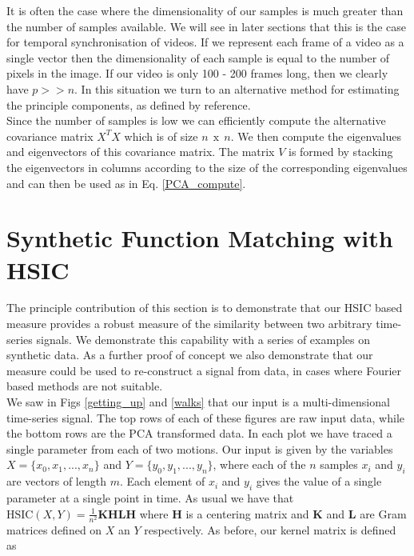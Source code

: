 It is often the case where the dimensionality of our samples is much greater than the number of samples available. We will see in later sections that this is the case for temporal synchronisation of videos. If we represent each frame of a video as a single vector then the dimensionality of each sample is equal to the number of pixels in the image. If our video is only 100 - 200 frames long, then we clearly have $p >> n$. In this situation we turn to an alternative method for estimating the principle components, as defined by reference. \\

Since the number of samples is low we can efficiently compute the alternative covariance matrix $X^{T} X$ which is of size $n\:\:\text{x}\:\:n$. We then compute the eigenvalues and eigenvectors of this covariance matrix. The matrix $V$ is formed by stacking the eigenvectors in columns according to the size of the corresponding eigenvalues and can then be used as in Eq. \ref{PCA_compute}.\\


\section{Synthetic Function Matching with HSIC}

The principle contribution of this section is to demonstrate that our HSIC based measure provides a robust measure of the similarity between two arbitrary time-series signals. We demonstrate this capability with a series of examples on synthetic data. As a further proof of concept we also demonstrate that our measure could be used to re-construct a signal from data, in cases where Fourier based methods are not suitable. \\

We saw in Figs \ref{getting_up} and \ref{walks} that our input is a multi-dimensional time-series signal. The top rows of each of these figures are raw input data, while the bottom rows are the PCA transformed data. In each plot we have traced a single parameter from each of two motions. Our input is given by the variables $X = \{x_0, x_1, ..., x_n\}$ and $Y = \{y_0, y_1, ..., y_n\}$, where each of the $n$ samples $x_i$ and $y_i$ are vectors of length $m$. Each element of $x_i$ and $y_i$ gives the value of a single parameter at a single point in time. As usual we have that $\text{HSIC}(X, Y) = \frac{1}{n^2}\textbf{KHLH}$ where $\textbf{H}$ is a centering matrix and $\textbf{K}$ and $\textbf{L}$ are Gram matrices defined on $X$ an $Y$ respectively. As before, our kernel matrix is defined as


